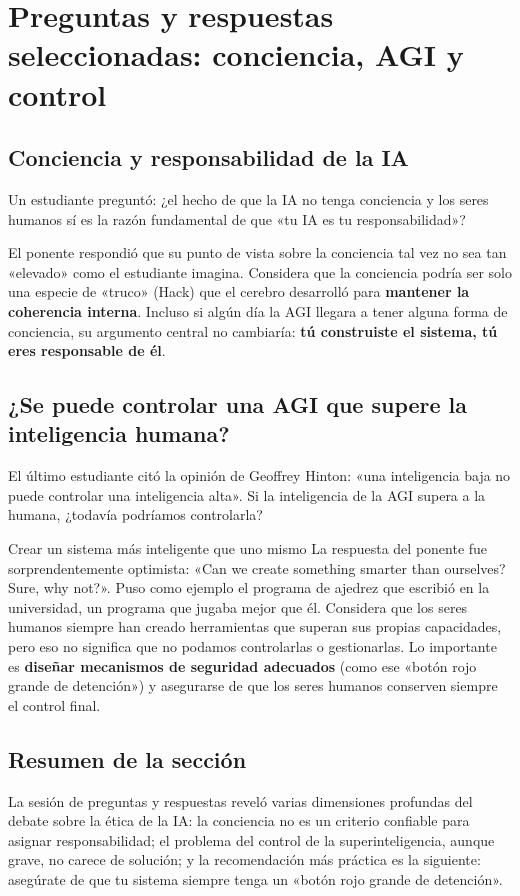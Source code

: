 \section{Preguntas y respuestas seleccionadas: conciencia, AGI y control}

\subsection{Conciencia y responsabilidad de la IA}

Un estudiante preguntó: ¿el hecho de que la IA no tenga conciencia y los seres humanos sí es la razón fundamental de que «tu IA es tu responsabilidad»?

El ponente respondió que su punto de vista sobre la conciencia tal vez no sea tan «elevado» como el estudiante imagina. Considera que la conciencia podría ser solo una especie de «truco» (Hack) que el cerebro desarrolló para \textbf{mantener la coherencia interna}. Incluso si algún día la AGI llegara a tener alguna forma de conciencia, su argumento central no cambiaría: \textbf{tú construiste el sistema, tú eres responsable de él}.

\subsection{¿Se puede controlar una AGI que supere la inteligencia humana?}

El último estudiante citó la opinión de Geoffrey Hinton: «una inteligencia baja no puede controlar una inteligencia alta». Si la inteligencia de la AGI supera a la humana, ¿todavía podríamos controlarla?

\begin{knowledgebox}{Crear un sistema más inteligente que uno mismo}
La respuesta del ponente fue sorprendentemente optimista: «Can we create something smarter than ourselves? Sure, why not?». Puso como ejemplo el programa de ajedrez que escribió en la universidad, un programa que jugaba mejor que él. Considera que los seres humanos siempre han creado herramientas que superan sus propias capacidades, pero eso no significa que no podamos controlarlas o gestionarlas. Lo importante es \textbf{diseñar mecanismos de seguridad adecuados} (como ese «botón rojo grande de detención») y asegurarse de que los seres humanos conserven siempre el control final.
\end{knowledgebox}

\subsection{Resumen de la sección}

La sesión de preguntas y respuestas reveló varias dimensiones profundas del debate sobre la ética de la IA: la conciencia no es un criterio confiable para asignar responsabilidad; el problema del control de la superinteligencia, aunque grave, no carece de solución; y la recomendación más práctica es la siguiente: asegúrate de que tu sistema siempre tenga un «botón rojo grande de detención».
